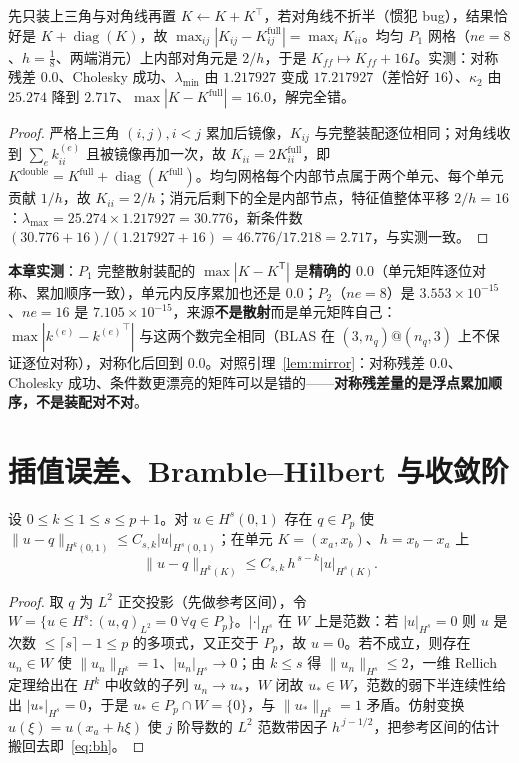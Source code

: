 \begin{lemma}
\label{lem:mirror}
先只装上三角与对角线再置 $K\leftarrow K+K^{\top}$，若对角线不折半（惯犯 bug），结果恰好是 $K+\operatorname{diag}(K)$，故
$\max_{ij}|K_{ij}-K^{\text{full}}_{ij}|=\max_iK_{ii}$。均匀 $P_1$
网格（$ne=8$、$h=\frac18$、两端消元）上内部对角元是 $2/h$，于是 $K_{ff}\mapsto K_{ff}+16I$。实测：对称残差 $0.0$、Cholesky
成功、$\lambda_{\min}$ 由 $1.217927$ 变成 $17.217927$（差恰好 $16$）、$\kappa_2$ 由 $25.274$ 降到
$2.717$、$\max|K-K^{\text{full}}|=16.0$，解完全错。
\end{lemma}
\begin{proof}
严格上三角 $(i,j),i<j$ 累加后镜像，$K_{ij}$ 与完整装配逐位相同；对角线收到 $\sum_ek^{(e)}_{ii}$ 且被镜像再加一次，故
$K_{ii}=2K_{ii}^{\text{full}}$，即
$K^{\text{double}}=K^{\text{full}}+\operatorname{diag}(K^{\text{full}})$。均匀网格每个内部节点属于两个单元、每个单元贡献
$1/h$，故 $K_{ii}=2/h$；消元后剩下的全是内部节点，特征值整体平移
$2/h=16$：$\lambda_{\max}=25.274\times1.217927=30.776$，新条件数
$(30.776+16)/(1.217927+16)=46.776/17.218=2.717$，与实测一致。
\end{proof}

\textbf{本章实测}：$P_1$ 完整散射装配的 $\max|K-K^{\mathsf T}|$ 是\textbf{精确的
$0.0$}（单元矩阵逐位对称、累加顺序一致），单元内反序累加也还是 $0.0$；$P_2$（$ne=8$）是 $3.553\times10^{-15}$、$ne=16$ 是
$7.105\times10^{-15}$，来源\textbf{不是散射}而是单元矩阵自己：$\max|k^{(e)}-{k^{(e)}}^{\top}|$ 与这两个数完全相同（BLAS 在
$(3,n_q)@(n_q,3)$ 上不保证逐位对称），对称化后回到 $0.0$。对照引理~\ref{lem:mirror}：对称残差 $0.0$、Cholesky
成功、条件数更漂亮的矩阵可以是错的——\textbf{对称残差量的是浮点累加顺序，不是装配对不对}。

\section{插值误差、Bramble--Hilbert 与收敛阶}

\begin{lemma}
\label{lem:bh}
设 $0\le k\le1\le s\le p+1$。对 $u\in H^s(0,1)$ 存在 $q\in P_p$ 使 $\|u-q\|_{H^k(0,1)}\le
C_{s,k}|u|_{H^s(0,1)}$；在单元 $K=(x_a,x_b)$、$h=x_b-x_a$ 上
\begin{equation}
  \|u-q\|_{H^k(K)}\le C_{s,k}\,h^{\,s-k}|u|_{H^s(K)} .
  \label{eq:bh}
\end{equation}
\end{lemma}
\begin{proof}
取 $q$ 为 $L^2$ 正交投影（先做参考区间），令 $W=\{u\in H^s:(u,q)_{L^2}=0\ \forall q\in P_p\}$。$|\cdot|_{H^s}$ 在
$W$ 上是范数：若 $|u|_{H^s}=0$ 则 $u$ 是次数 $\le\lceil s\rceil-1\le p$ 的多项式，又正交于 $P_p$，故 $u=0$。若不成立，则存在
$u_n\in W$ 使 $\|u_n\|_{H^k}=1$、$|u_n|_{H^s}\to0$；由 $k\le s$ 得 $\|u_n\|_{H^s}\le2$，一维 Rellich
定理给出在 $H^k$ 中收敛的子列 $u_n\to u_*$，$W$ 闭故 $u_*\in W$，范数的弱下半连续性给出 $|u_*|_{H^s}=0$，于是 $u_*\in P_p\cap
W=\{0\}$，与 $\|u_*\|_{H^k}=1$ 矛盾。仿射变换 $\hat u(\xi)=u(x_a+h\xi)$ 使 $j$ 阶导数的 $L^2$ 范数带因子
$h^{\,j-1/2}$，把参考区间的估计搬回去即~\eqref{eq:bh}。
\end{proof}

